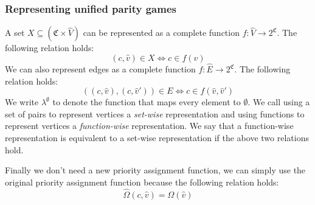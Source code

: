 \subsubsection{Representing unified parity games}
A set $X \subseteq (\mathfrak{C} \times \hat{V})$ can be represented as a complete function $f : \hat{V} \rightarrow 2^\mathfrak{C}$. The following relation holds:
\[ (c,\hat{v}) \in X \iff c \in f(\hat{v}) \]
We can also represent edges as a complete function $f : \hat{E} \rightarrow 2^\mathfrak{C}$. The following relation holds:
\[ ((c,\hat{v}),(c,\hat{v}')) \in E \iff c \in f(\hat{v},\hat{v}') \]
We write $\lambda^\emptyset$ to denote the function that maps every element to $\emptyset$. We call using a set of pairs to represent vertices a \textit{set-wise} representation and using functions to represent vertices a \textit{function-wise} representation. We say that a function-wise representation is equivalent to a set-wise representation if the above two relations hold.


Finally we don't need a new priority assignment function, we can simply use the original priority assignment function because the following relation holds:
\[ \hat{\Omega}(c,\hat{v}) = \Omega(\hat{v}) \]